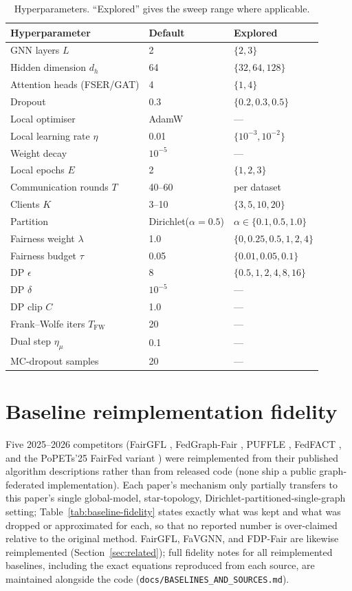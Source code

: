 \documentclass[pdflatex,sn-mathphys-num]{sn-jnl}
\theoremstyle{thmstyleone}%
\theoremstyle{thmstyletwo}%
\theoremstyle{thmstylethree}%
\begin{document}
\begin{appendices}
\begin{table}[h]
\centering\small
\caption{Hyperparameters. ``Explored'' gives the sweep range where applicable.}
\label{tab:hyper}
\begin{tabular}{lll}
\toprule
Hyperparameter & Default & Explored \\
\midrule
GNN layers $L$ & 2 & $\{2,3\}$ \\
Hidden dimension $d_h$ & 64 & $\{32,64,128\}$ \\
Attention heads (FSER/GAT) & 4 & $\{1,4\}$ \\
Dropout & 0.3 & $\{0.2,0.3,0.5\}$ \\
Local optimiser & AdamW & --- \\
Local learning rate $\eta$ & 0.01 & $\{10^{-3},10^{-2}\}$ \\
Weight decay & $10^{-5}$ & --- \\
Local epochs $E$ & 2 & $\{1,2,3\}$ \\
Communication rounds $T$ & 40--60 & per dataset \\
Clients $K$ & 3--10 & $\{3,5,10,20\}$ \\
Partition & Dirichlet($\alpha{=}0.5$) & $\alpha\in\{0.1,0.5,1.0\}$ \\
Fairness weight $\lambda$ & 1.0 & $\{0,0.25,0.5,1,2,4\}$ \\
Fairness budget $\tau$ & 0.05 & $\{0.01,0.05,0.1\}$ \\
DP $\epsilon$ & 8 & $\{0.5,1,2,4,8,16\}$ \\
DP $\delta$ & $10^{-5}$ & --- \\
DP clip $C$ & 1.0 & --- \\
Frank--Wolfe iters $T_{\mathrm{FW}}$ & 20 & --- \\
Dual step $\eta_\mu$ & 0.1 & --- \\
MC-dropout samples & 20 & --- \\
\bottomrule
\end{tabular}
\end{table}

\section{Baseline reimplementation fidelity}
\label{app:baselines}
Five 2025--2026 competitors (FairGFL \cite{fairgfl2026}, FedGraph-Fair
\cite{fedgraphfair2026}, PUFFLE \cite{corbucci2024puffle}, FedFACT
\cite{fedfact2025}, and the PoPETs'25 FairFed variant
\cite{bendoukha2025popets}) were reimplemented from their published algorithm
descriptions rather than from released code (none ship a public
graph-federated implementation). Each paper's mechanism only partially
transfers to this paper's single global-model, star-topology,
Dirichlet-partitioned-single-graph setting; Table~\ref{tab:baseline-fidelity}
states exactly what was kept and what was dropped or approximated for each, so
that no reported number is over-claimed relative to the original method.
FairGFL, FaVGNN, and FDP-Fair are likewise reimplemented (Section~\ref{sec:related});
full fidelity notes for all reimplemented baselines, including the exact
equations reproduced from each source, are maintained alongside the code
(\texttt{docs/BASELINES\_AND\_SOURCES.md}).


\end{appendices}
\end{document}
